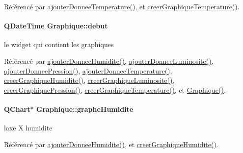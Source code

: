 Référencé par \hyperlink{class_graphique_a42b3c986ca86c426adbb8fdb03a04380}{ajouter\+Donnee\+Temperature()}, et \hyperlink{class_graphique_ad9b976804bafcbfe451d89fd35729d16}{creer\+Graphique\+Temperature()}.

\paragraph[{\texorpdfstring{debut}{debut}}]{\setlength{\rightskip}{0pt plus 5cm}Q\+Date\+Time Graphique\+::debut\hspace{0.3cm}{\ttfamily [private]}}\hypertarget{class_graphique_a468d57ae7b14b46558cf25629cced7b6}{}\label{class_graphique_a468d57ae7b14b46558cf25629cced7b6}
le widget qui contient les graphiques 

Référencé par \hyperlink{class_graphique_ad3dd36f05a9923054a0a2138f96f0311}{ajouter\+Donnee\+Humidite()}, \hyperlink{class_graphique_a1af0e1968998cb7b5ee8add1197cb0e0}{ajouter\+Donnee\+Luminosite()}, \hyperlink{class_graphique_a289f0631e56465012511fd7ec9da1b23}{ajouter\+Donnee\+Pression()}, \hyperlink{class_graphique_a42b3c986ca86c426adbb8fdb03a04380}{ajouter\+Donnee\+Temperature()}, \hyperlink{class_graphique_a19d6deef2d11e95093a343d49f75d14e}{creer\+Graphique\+Humidite()}, \hyperlink{class_graphique_a3b55b9c4732856e1b25bef167c25ac4c}{creer\+Graphique\+Luminosite()}, \hyperlink{class_graphique_adc50b5ae7a54dd576c99e74ec6bf74c5}{creer\+Graphique\+Pression()}, \hyperlink{class_graphique_ad9b976804bafcbfe451d89fd35729d16}{creer\+Graphique\+Temperature()}, et \hyperlink{class_graphique_a3aec0a5aaae78f0726771dea67af69b4}{Graphique()}.

\paragraph[{\texorpdfstring{graphe\+Humidite}{grapheHumidite}}]{\setlength{\rightskip}{0pt plus 5cm}Q\+Chart$\ast$ Graphique\+::graphe\+Humidite\hspace{0.3cm}{\ttfamily [private]}}\hypertarget{class_graphique_a992da12af1bcf950a9a5fb9799b8f86b}{}\label{class_graphique_a992da12af1bcf950a9a5fb9799b8f86b}
l\textquotesingle{}axe X humidite 

Référencé par \hyperlink{class_graphique_ad3dd36f05a9923054a0a2138f96f0311}{ajouter\+Donnee\+Humidite()}, et \hyperlink{class_graphique_a19d6deef2d11e95093a343d49f75d14e}{creer\+Graphique\+Humidite()}.

